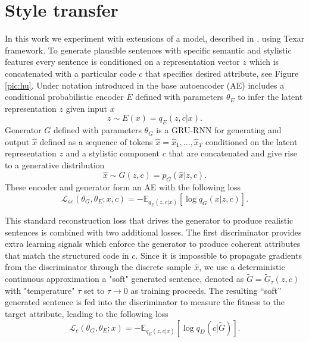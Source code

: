 \documentclass[11pt,a4paper]{article}
\begin{document}
\section{Style transfer}
\label{sec:st}
In this work we experiment with extensions of a model, described in \cite{hylsx}, using Texar \cite{hutexar} framework. To generate plausible sentences with specific semantic and stylistic features every sentence is conditioned on a representation vector $z$ which is concatenated with a particular code $c$ that specifies desired attribute, see Figure \ref{pic:hu}. Under notation introduced in \cite{hylsx} the base autoencoder (AE) includes a conditional probabilistic encoder $E$ defined with parameters $\theta_E$ to infer the latent representation $z$ given input $x$
$$z \sim E(x) = q_{E}(z,c|x).$$
Generator $G$ defined with parameters  $\theta_G$ is a GRU-RNN for generating and output $\hat{x}$ defined as a sequence of tokens $\hat{x} = {\hat{x}_1, ..., \hat{x}_T}$ conditioned on the latent representation $z$ and a stylistic component $c$ that are concatenated and give rise to a generative distribution
$$\hat{x} \sim G(z,c) = p_G(\hat{x}|z, c).$$
These encoder and generator form an AE with the following loss
\begin{equation}
\label{eq:lossae}
\mathcal{L}_{ae} (\theta_G, \theta_E; x,c) = - \mathbb{E}_{q_{E} (z,c|x)} \left[ \log q_G (x|z, c) \right].
\end{equation}

This standard reconstruction loss that drives the generator to produce realistic sentences is combined with two additional losses. The first discriminator provides extra learning signals which enforce the generator to produce coherent attributes that match the structured code in $c$. Since it is impossible to propagate gradients from the discriminator through the discrete sample $\hat{x}$, we use a deterministic continuous approximation a "soft" generated sentence, denoted as $\tilde{G} = \tilde{G}_\tau (z, c)$ with "temperature" $\tau$ set to $\tau \rightarrow 0$ as training proceeds. The resulting “soft” generated sentence is fed into the discriminator to measure the fitness to the target attribute, leading to the following loss
\begin{equation}
\mathcal{L}_{c} (\theta_G, \theta_E; x) = -\mathbb{E}_{q_{E} (z,c|x)}  \left[ \log q_D (c | \tilde{G}) \right]. \label{eq:lossc}
\end{equation}
\end{document}

